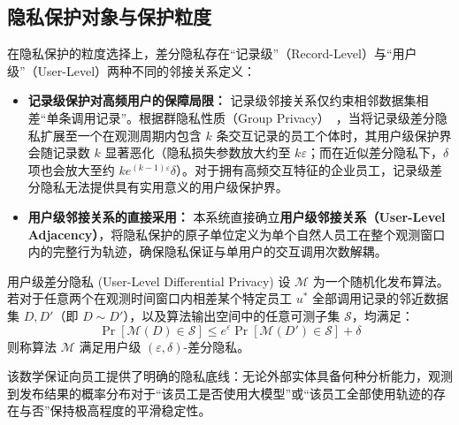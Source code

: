 \subsection{隐私保护对象与保护粒度}
在隐私保护的粒度选择上，差分隐私存在“记录级”（Record-Level）与“用户级”（User-Level）两种不同的邻接关系定义：
\begin{itemize}[leftmargin=2em]
  \item \textbf{记录级保护对高频用户的保障局限：} 记录级邻接关系仅约束相邻数据集相差“单条调用记录”。根据群隐私性质（Group Privacy）~\cite{dwork2014algorithmic}，当将记录级差分隐私扩展至一个在观测周期内包含 $k$ 条交互记录的员工个体时，其用户级保护界会随记录数 $k$ 显著恶化（隐私损失参数放大约至 $k\varepsilon$；而在近似差分隐私下，$\delta$ 项也会放大至约 $k e^{(k-1)\varepsilon} \delta$）。对于拥有高频交互特征的企业员工，记录级差分隐私无法提供具有实用意义的用户级保护界。
  \item \textbf{用户级邻接关系的直接采用：} 本系统直接确立\textbf{用户级邻接关系（User-Level Adjacency）}，将隐私保护的原子单位定义为单个自然人员工在整个观测窗口内的完整行为轨迹，确保隐私保证与单用户的交互调用次数解耦。
\end{itemize}

\begin{definitionbox}{用户级差分隐私 (User-Level Differential Privacy)}
设 $\mathcal{M}$ 为一个随机化发布算法。若对于任意两个在观测时间窗口内相差某个特定员工 $u^*$ 全部调用记录的邻近数据集 $D, D'$（即 $D \sim D'$），以及算法输出空间中的任意可测子集 $\mathcal{S}$，均满足：
\begin{equation}
  \Pr[\mathcal{M}(D) \in \mathcal{S}] \le e^\varepsilon \Pr[\mathcal{M}(D') \in \mathcal{S}] + \delta
\end{equation}
则称算法 $\mathcal{M}$ 满足用户级 $(\varepsilon, \delta)$-差分隐私。
\end{definitionbox}

该数学保证向员工提供了明确的隐私底线：无论外部实体具备何种分析能力，观测到发布结果的概率分布对于“该员工是否使用大模型”或“该员工全部使用轨迹的存在与否”保持极高程度的平滑稳定性。

